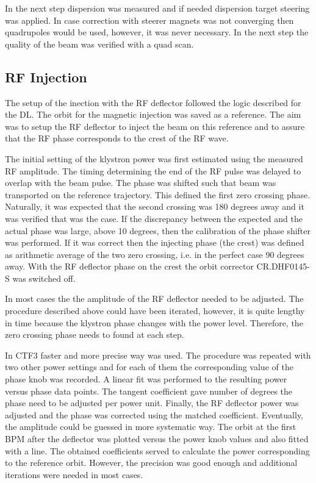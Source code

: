 In the next step dispersion was measured and if needed dispersion target steering was applied. 
In case correction with steerer magnets was not converging then quadrupoles would be used,
however, it was never necessary. In the next step the quality of the beam was verified with
a quad scan.

\subsection{RF Injection}

The setup of the inection with the RF deflector followed the logic described for the \ac{DL}.
The orbit for the magnetic injection was saved as a reference.
The aim was to setup the RF deflector to inject the beam on this reference and 
to assure that the RF phase corresponds to the crest of the RF wave.

The initial setting of the klystron power was first estimated using the measured RF amplitude.
The timing determining the end of the RF pulse was delayed to overlap with the beam pulse.
The phase was shifted such that beam was transported on the reference trajectory. 
This defined the first zero crossing phase. Naturally, it was expected that 
the second crossing was 180 degrees away and it was verified that was the case. 
If the discrepancy between the expected and the actual phase was large, above 10 degrees, 
then the calibration of the phase shifter was performed. 
If it was correct then the injecting phase (the crest) was defined as arithmetic average of 
the two zero crossing, i.e. in the perfect case 90 degrees away. 
With the RF deflector phase on the crest the orbit corrector CR.DHF0145-S was switched off.

In most cases the the amplitude of the RF deflector needed to be adjusted.
The procedure described above could have been iterated, however, 
it is quite lengthy in time because the klystron phase changes with the power level.
Therefore, the zero crossing phase needs to found at each step.

In CTF3 faster and more precise way was used. 
The procedure was repeated with two other power settings and for each of them 
the corresponding value of the phase knob was recorded. 
A linear fit was performed to the resulting power versus phase data points. 
The tangent coefficient gave number of degrees the phase need 
to be adjusted per power unit. Finally, the RF deflector power was adjusted and 
the phase was corrected using the matched coefficient. 
Eventually, the amplitude could be guessed in more systematic way. 
The orbit at the first BPM after the deflector was plotted versus
the power knob values and also fitted with a line. 
The obtained coefficients served to calculate the power corresponding 
to the reference orbit. However, the precision was good enough and
additional iterations were needed in most cases.

